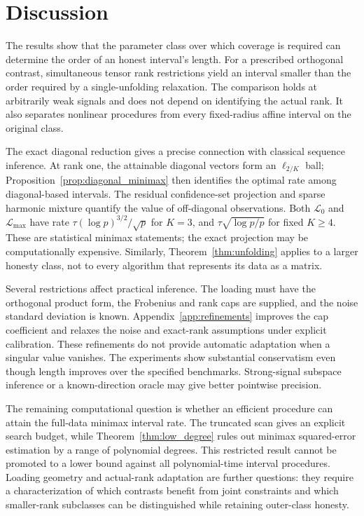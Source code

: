 \documentclass[11pt]{article}
\theoremstyle{remark}
\begin{document}
\section{Discussion}\label{sec:discussion}

The results show that the parameter class over which coverage is required can determine the order of an honest interval's length. For a prescribed orthogonal contrast, simultaneous tensor rank restrictions yield an interval smaller than the order required by a single-unfolding relaxation. The comparison holds at arbitrarily weak signals and does not depend on identifying the actual rank. It also separates nonlinear procedures from every fixed-radius affine interval on the original class.

The exact diagonal reduction gives a precise connection with classical sequence inference. At rank one, the attainable diagonal vectors form an $\ell_{2/K}$ ball; Proposition~\ref{prop:diagonal_minimax} then identifies the optimal rate among diagonal-based intervals. The residual confidence-set projection and sparse harmonic mixture quantify the value of off-diagonal observations. Both $\mathcal L_0$ and $\mathcal L_{\max}$ have rate $\tau(\log p)^{3/2}/\sqrt p$ for $K=3$, and $\tau\sqrt{\log p/p}$ for fixed $K\ge4$. These are statistical minimax statements; the exact projection may be computationally expensive. Similarly, Theorem~\ref{thm:unfolding} applies to a larger honesty class, not to every algorithm that represents its data as a matrix.

Several restrictions affect practical inference. The loading must have the orthogonal product form, the Frobenius and rank caps are supplied, and the noise standard deviation is known. Appendix~\ref{app:refinements} improves the cap coefficient and relaxes the noise and exact-rank assumptions under explicit calibration. These refinements do not provide automatic adaptation when a singular value vanishes. The experiments show substantial conservatism even though length improves over the specified benchmarks. Strong-signal subspace inference or a known-direction oracle may give better pointwise precision.

The remaining computational question is whether an efficient procedure can attain the full-data minimax interval rate. The truncated scan gives an explicit search budget, while Theorem~\ref{thm:low_degree} rules out minimax squared-error estimation by a range of polynomial degrees. This restricted result cannot be promoted to a lower bound against all polynomial-time interval procedures. Loading geometry and actual-rank adaptation are further questions: they require a characterization of which contrasts benefit from joint constraints and which smaller-rank subclasses can be distinguished while retaining outer-class honesty.
\end{document}

